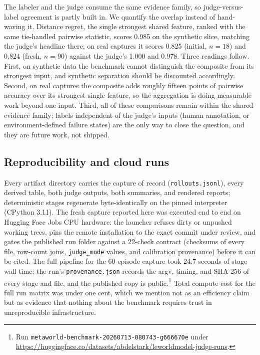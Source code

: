 \documentclass[11pt]{article}
\newcommand{\judgemode}[1]{\texttt{#1}}
\begin{document}
The labeler and the judge consume the same evidence family, so judge-versus-label agreement
is partly built in. We quantify the overlap instead of hand-waving it. Distance regret, the
single strongest shared feature, ranked with the same tie-handled pairwise statistic,
scores 0.985 on the synthetic slice, matching the judge's headline there; on real captures
it scores 0.825 (initial, $n{=}18$) and 0.824 (fresh, $n{=}90$) against the judge's 1.000
and 0.978. Three readings follow. First, on synthetic data the benchmark cannot distinguish
the composite from its strongest input, and synthetic separation should be discounted
accordingly. Second, on real captures the composite adds roughly fifteen points of pairwise
accuracy over its strongest single feature, so the aggregation is doing measurable work
beyond one input. Third, all of these comparisons remain within the shared evidence family;
labels independent of the judge's inputs (human annotation, or environment-defined failure
states) are the only way to close the question, and they are future work, not shipped.

\subsection{Reproducibility and cloud runs}
\label{sec:repro}

Every artifact directory carries the capture of record (\texttt{rollouts.jsonl}), every
derived table, both judge outputs, both summaries, and rendered reports; deterministic
stages regenerate byte-identically on the pinned interpreter (CPython 3.11). The fresh
capture reported here was executed end to end on Hugging Face Jobs CPU hardware: the
launcher refuses dirty or unpushed working trees, pins the remote installation to the exact
commit under review, and gates the published run folder against a 22-check contract
(checksums of every file, row-count joins, \judgemode{judge\_mode} values, and calibration
provenance) before it can be cited. The full pipeline for the 60-episode capture took 24.7
seconds of stage wall time; the run's \texttt{provenance.json} records the argv, timing,
and SHA-256 of every stage and file, and the published copy is public.\footnote{Run
\texttt{metaworld-benchmark-20260713-080743-g666670e} under
\url{https://huggingface.co/datasets/abdelstark/leworldmodel-judge-runs}.} Total compute
cost for the full run matrix was under one cent, which we mention not as an efficiency
claim but as evidence that nothing about the benchmark requires trust in unreproducible
infrastructure.
\end{document}
